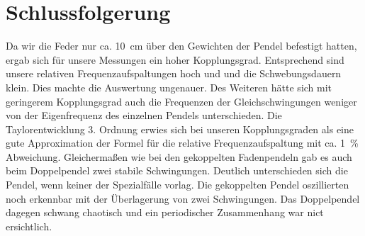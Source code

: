 \documentclass[
	a4paper,
	12pt,
	pagesize,
	ngerman
]{scrartcl}
\begin{document}
	\section{Schlussfolgerung}
	Da wir die Feder nur ca. \SI{10}{cm} über den Gewichten der Pendel befestigt hatten, ergab sich für unsere Messungen ein hoher Kopplungsgrad. Entsprechend sind unsere relativen Frequenzaufspaltungen hoch und und die Schwebungsdauern klein.  Dies machte die Auswertung ungenauer. Des Weiteren hätte sich mit geringerem Kopplungsgrad auch die Frequenzen der Gleichschwingungen weniger von der Eigenfrequenz des einzelnen Pendels unterschieden.
	Die Taylorentwicklung 3. Ordnung erwies sich bei unseren Kopplungsgraden als eine gute Approximation der Formel für die relative Frequenzaufspaltung mit ca. \SI{1}{\%} Abweichung.
	Gleichermaßen wie bei den gekoppelten Fadenpendeln gab es auch beim Doppelpendel zwei stabile Schwingungen. Deutlich unterschieden sich die Pendel, wenn keiner der Spezialfälle vorlag. Die gekoppelten Pendel oszillierten noch erkennbar mit der Überlagerung von zwei Schwingungen. Das Doppelpendel dagegen schwang chaotisch und ein periodischer Zusammenhang war nict ersichtlich.
	
\end{document}
